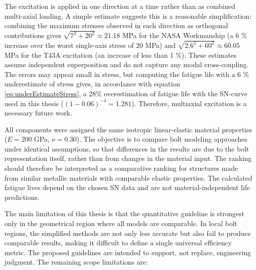 \documentclass[a4paper,twoside]{bth}
\begin{document}
The excitation is applied in one direction at a time rather than as combined multi-axial loading. A simple estimate suggests this is a reasonable simplification: combining the maximum stresses observed in each direction as orthogonal contributions gives $\sqrt{7^2 + 20^2} \approx 21.18$ MPa for the NASA Workmanship (a 6 \% increase over the worst single-axis stress of $20$ MPa) and $\sqrt{2.6^2 + 60^2} \approx 60.05$ MPa for the T43A excitation (an increase of less than 1 \%). These estimates assume independent superposition and do not capture any modal cross-coupling. The errors may appear small in stress, but computing the fatigue life with a 6 \% underestimate of stress gives, in accordance with equation \ref{eq:underEstimateStress}, a 28\% overestimation of fatigue life with the SN-curve used in this thesis ($(1-0.06)^{-4} = 1.281$). Therefore, multiaxial excitation is a necessary future work.

All components were assigned the same isotropic linear-elastic material properties ($E = 200$ GPa, $\nu = 0.30$). The objective is to compare bolt modeling approaches under identical assumptions, so that differences in the results are due to the bolt representation itself, rather than from changes in the material input. The ranking should therefore be interpreted as a comparative ranking for structures made from similar metallic materials with comparable elastic properties. The calculated fatigue lives depend on the chosen SN data and are not material-independent life predictions.

The main limitation of this thesis is that the quantitative guideline is strongest only in the geometrical region where all models are comparable. In local bolt regions, the simplified methods are not only less accurate but also fail to produce comparable results, making it difficult to define a single universal efficiency metric. The proposed guidelines are intended to support, not replace, engineering judgment. The remaining scope limitations are:
\end{document}
